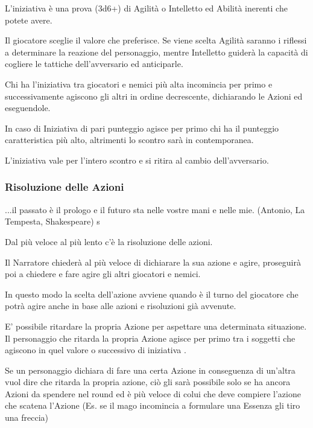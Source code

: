 \documentclass[a4paper,11pt,twoside,openany]{book}
\begin{document}
L'iniziativa è una prova (3d6+) di Agilità o Intelletto ed Abilità inerenti che potete avere.

Il giocatore sceglie il valore che preferisce. Se viene scelta Agilità saranno i riflessi a determinare la reazione del personaggio, mentre Intelletto guiderà la capacità di cogliere le tattiche dell'avversario ed anticiparle.

Chi ha l'iniziativa tra giocatori e nemici più alta incomincia per primo e successivamente agiscono gli altri in ordine decrescente, dichiarando le Azioni ed eseguendole.

In caso di Iniziativa di pari punteggio agisce per primo chi ha il punteggio caratteristica più alto, altrimenti lo scontro sarà in contemporanea.

L'iniziativa vale per l'intero scontro e si ritira al cambio dell'avversario.

\subsubsection{Risoluzione delle Azioni}

\begin{tcolorbox}[enhanced,arc=5pt,boxrule=0.3pt]{
...il passato è il prologo e il futuro sta nelle vostre mani e nelle mie. (Antonio, La Tempesta, Shakespeare)}
s\end{tcolorbox}\medskip


\label{risoluzione-delle-azioni}

Dal più veloce al più lento c'è la risoluzione delle azioni.

Il Narratore chiederà al più veloce di dichiarare la sua azione e agire, proseguirà poi a chiedere e fare agire gli altri giocatori e nemici.

In questo modo la scelta dell'azione avviene quando è il turno del giocatore che potrà agire anche in base alle azioni e risoluzioni già avvenute.

E' possibile ritardare la propria Azione per aspettare una determinata situazione. Il personaggio che ritarda la propria Azione agisce per primo tra i soggetti che agiscono in quel valore o successivo di iniziativa .

Se un personaggio dichiara di fare una certa Azione in conseguenza di un'altra vuol dire che ritarda la propria azione, ciò gli sarà possibile solo se ha ancora Azioni da spendere nel round ed è più veloce di colui che deve compiere l'azione che scatena l'Azione (Es. se il mago incomincia a formulare una Essenza gli tiro una freccia)
\end{document}
